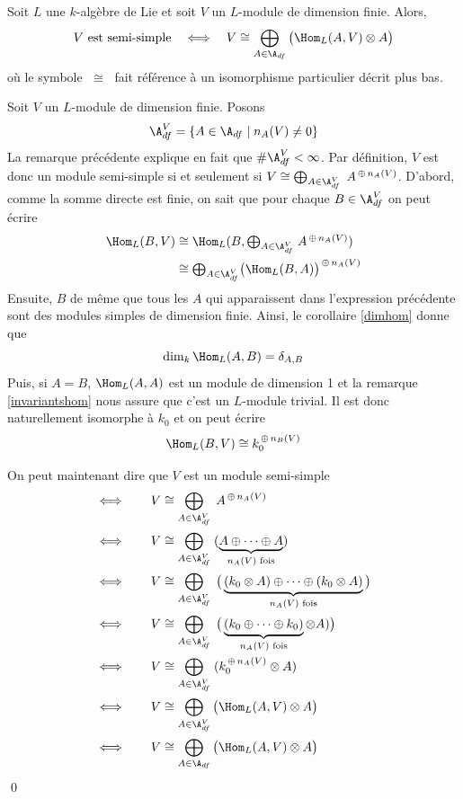 \begin{Prop} Soit $L$ une $k$-algèbre de Lie et soit $V$ un $L$-module de dimension finie. Alors,
$$ V \text{ est semi-simple} \quad \Longleftrightarrow \quad V \cong \bigoplus_{A \in \A_{df}} \big(\Hom_L(A,V) \otimes A\big) $$
où le symbole $\;\cong\;$ fait référence à un isomorphisme particulier décrit plus bas.
\begin{pre} Soit $V$ un $L$-module de dimension finie. Posons 
$$ \A_{df}^V = \{A \in \A_{df} \; | \; n_A(V) \neq 0\} $$
La remarque précédente explique en fait que $\# \A_{df}^V < \infty$. Par définition, $V$ est donc un module semi-simple si et seulement si $V \cong \bigoplus_{A \in \A_{df}^V} \; A^{\,\oplus\, n_A(V)}$. D'abord, comme la somme directe est finie, on sait que pour chaque $B \in \A_{df}^V$ on peut écrire 
\begin{align*}
\Hom_L(B,V) &\cong \Hom_L(B,\textstyle{\bigoplus_{A \in \A_{df}^V}} \; A^{\,\oplus\, n_A(V)})\\
&\cong \textstyle{\bigoplus_{A \in \A_{df}^V}} \big(\Hom_L(B,A)\big)^{\,\oplus\, n_A(V)}
\end{align*}
Ensuite, $B$ de même que tous les $A$ qui apparaissent dans l'expression précédente sont des modules simples de dimension finie. Ainsi, le corollaire \ref{dimhom} donne que 
$$ \dim_k \Hom_L(A,B) = \delta_{A,B} $$
Puis, si $A = B$, $\Hom_L(A,A)$ est un module de dimension 1 et la remarque \ref{invariantshom} nous assure que c'est un $L$-module trivial. Il est donc naturellement isomorphe à $k_0$ et on peut écrire
$$ \Hom_L(B,V) \cong k_0^{\,\oplus\, n_B(V)} $$

On peut maintenant dire que $V$ est un module semi-simple
\begin{align*}
&\Longleftrightarrow \qquad V \cong \bigoplus_{A \in \A_{df}^V} \; A^{\,\oplus\, n_A(V)}\\
&\Longleftrightarrow \qquad V \cong \bigoplus_{A \in \A_{df}^V} \; (\underbrace{A \oplus \cdots \oplus A}_{n_A(V) \text{ fois}})\\
&\Longleftrightarrow \qquad V \cong \bigoplus_{A \in \A_{df}^V} \; \big(\underbrace{(k_0 \otimes A) \oplus \cdots \oplus (k_0 \otimes A)}_{n_A(V) \text{ fois}}\big)\\
&\Longleftrightarrow \qquad V \cong \bigoplus_{A \in \A_{df}^V} \; \big(\underbrace{(k_0 \oplus \cdots \oplus k_0)}_{n_A(V) \text{ fois}} \otimes A)\big)\\
&\Longleftrightarrow \qquad V \cong \bigoplus_{A \in \A_{df}^V} \; (k_0^{\,\oplus\, n_A(V)} \otimes A)\\
&\Longleftrightarrow \qquad V \cong \bigoplus_{A \in \A_{df}^V} \big(\Hom_L(A,V) \otimes A\big)\\
&\Longleftrightarrow \qquad V \cong \bigoplus_{A \in \A_{df}} \big(\Hom_L(A,V) \otimes A\big)
\end{align*}
\qed
\end{pre}
\end{Prop}
 

